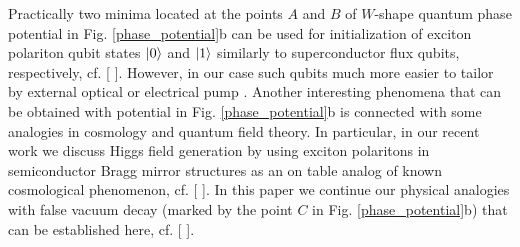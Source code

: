 \documentclass[aps, pre, preprint, groupedaddress, superscriptaddress, showkeys, showpacs] {revtex4-1}
\DeclarePairedDelimiter\ket{\lvert}{\rangle}
\begin{document}
Practically two minima located at the points $A$ and $B$ of $W$-shape quantum phase potential in Fig. \ref{phase_potential}b can be used for initialization of exciton polariton qubit states $\ket{0}$ and $\ket{1}$ similarly to superconductor flux qubits, respectively, {\red cf. [ ]}.
However, in our case such qubits much more easier to tailor by external optical or electrical pump {\red [ ]}.
Another interesting phenomena that can be obtained with potential in Fig. \ref{phase_potential}b is connected with some analogies in cosmology and quantum field theory.
In particular, in our recent work {\red [ ]} we discuss Higgs field generation by using exciton polaritons in semiconductor Bragg mirror structures as an on table analog of known cosmological phenomenon, {\red cf. [ ]}.
In this paper we continue our physical analogies with false vacuum decay (marked by the point $C$ in Fig. \ref{phase_potential}b) that can be established here, {\red cf. [ ]}.

\pagebreak


\end{document}
